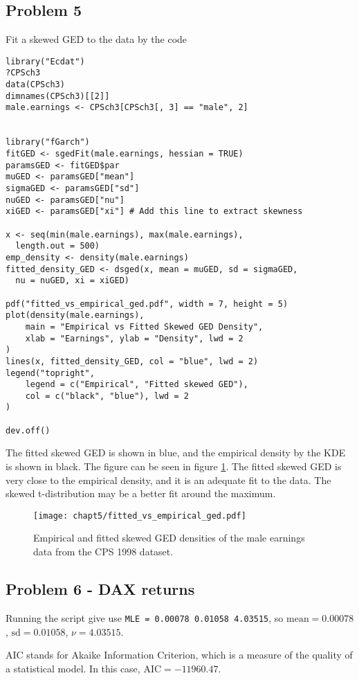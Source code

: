 \documentclass{article}
\begin{document}
\subsection{Problem 5}
Fit a skewed GED to the data by the code
\begin{verbatim}
library("Ecdat")
?CPSch3
data(CPSch3)
dimnames(CPSch3)[[2]]
male.earnings <- CPSch3[CPSch3[, 3] == "male", 2]


library("fGarch")
fitGED <- sgedFit(male.earnings, hessian = TRUE)
paramsGED <- fitGED$par
muGED <- paramsGED["mean"]
sigmaGED <- paramsGED["sd"]
nuGED <- paramsGED["nu"]
xiGED <- paramsGED["xi"] # Add this line to extract skewness

x <- seq(min(male.earnings), max(male.earnings),
  length.out = 500)
emp_density <- density(male.earnings)
fitted_density_GED <- dsged(x, mean = muGED, sd = sigmaGED,
  nu = nuGED, xi = xiGED)

pdf("fitted_vs_empirical_ged.pdf", width = 7, height = 5)
plot(density(male.earnings),
    main = "Empirical vs Fitted Skewed GED Density",
    xlab = "Earnings", ylab = "Density", lwd = 2
)
lines(x, fitted_density_GED, col = "blue", lwd = 2)
legend("topright",
    legend = c("Empirical", "Fitted skewed GED"),
    col = c("black", "blue"), lwd = 2
)

dev.off()
\end{verbatim}
The fitted skewed GED is shown in blue, and the empirical density by the KDE is shown in black.
The figure can be seen in figure \ref{fig:fitted_vs_empirical_ged}.
The fitted skewed GED is very close to the empirical density,
and it is an adequate fit to the data.
The skewed t-distribution may be a better fit around the maximum.

\begin{figure}
    \centering
    \texttt{[image: chapt5/fitted\_vs\_empirical\_ged.pdf]}
    \caption{Empirical and fitted skewed GED densities of
        the male earnings data from the CPS 1998 dataset.}
    \label{fig:fitted_vs_empirical_ged}

\end{figure}

\subsection{Problem 6 - DAX returns}
Running the script give use \texttt{MLE = 0.00078 0.01058 4.03515},
so $\text{mean} = 0.00078$, $\text{sd} = 0.01058$, $\nu = 4.03515$.

AIC stands for Akaike Information Criterion, which is a measure of the quality of a statistical model.
In this case, $\text{AIC} = -11960.47$.
\end{document}
